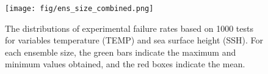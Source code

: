 \documentclass[gmd, manuscript]{copernicus}
\begin{document}
\clearpage
\begin {figure}[h]
\centering
\texttt{[image: fig/ens\_size\_combined.png]}
\caption{The distributions of experimental failure rates based on 1000 tests for variables temperature (TEMP) and sea surface height (SSH).  For each ensemble size, the green bars indicate the maximum and minimum values obtained, and the red boxes indicate the mean.   }
 \label {fig:temp_ens_80}
\end {figure}




 
\end{document}
